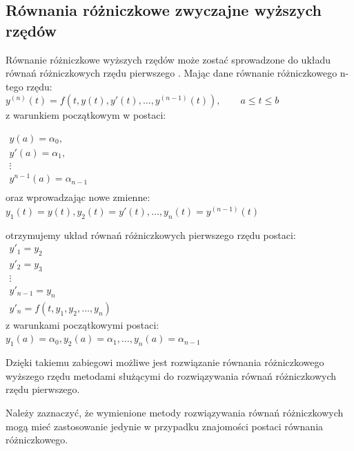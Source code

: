 \subsection*{Równania różniczkowe zwyczajne wyższych rzędów}
Równanie różniczkowe wyższych rzędów może zostać sprowadzone do układu równań różniczkowych rzędu pierwszego \cite{AK_RBG2002}. Mając dane równanie różniczkowego n-tego rzędu: \\ \hspace*{0.8cm} 
$y^{(n)}(t) = f(t,y(t),y'(t),\hdots,y^{(n-1)}(t)), \qquad a \leq t \leq b$ \\
z warunkiem początkowym w postaci: \\ \hspace*{0.8cm}

$\begin{array}{l}
y(a)       = \alpha_0,    \\
y'(a)      = \alpha_1,    \\
\vdots					  \\
y^{n-1}(a) = \alpha_{n-1} \\
\end{array}$ \\

oraz wprowadzając nowe zmienne: \\ \hspace*{0.8cm}
$y_1(t) = y(t), y_2(t) = y'(t), \hdots, y_n(t) = y^{(n-1)}(t)$

otrzymujemy układ równań różniczkowych pierwszego rzędu postaci: \\ \hspace*{0.8cm}
$\begin{array}{l}
y'_1       = y_2   \\
y'_2       = y_3   \\
\vdots			   \\
y'_{n-1} = y_n     \\
y'_n = f(t,y_1,y_2,\hdots,y_n)
\end{array}$ \\

z warunkami początkowymi postaci: \\ \hspace*{0.8cm}
$y_1(a) = \alpha_0, y_2(a) = \alpha_1, \hdots, y_n(a) = \alpha_{n-1}$ 

Dzięki takiemu zabiegowi możliwe jest rozwiązanie równania różniczkowego wyższego rzędu metodami służącymi do rozwiązywania równań różniczkowych rzędu pierwszego.

Należy zaznaczyć, że wymienione metody rozwiązywania równań różniczkowych mogą mieć zastosowanie jedynie w przypadku znajomości postaci równania różniczkowego.
 
